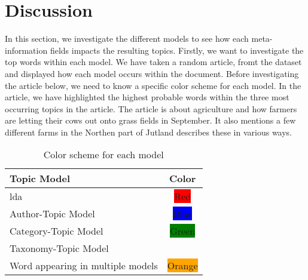 \section{Discussion}\label{sec:discussion}
In this section, we investigate the different models to see how each meta-information fields impacts the resulting topics.
Firstly, we want to investigate the top words within each model.
We have taken a random article, fromt the dataset and displayed how each model occurs within the document. 
Before investigating the article below, we need to know a specific color scheme for each model.
In the article, we have highlighted the highest probable words within the three most occurring topics in the article.
The article is about agriculture and how farmers are letting their cows out onto grass fields in September. 
It also mentions a few different farms in the Northen part of Jutland describes these in various ways.

\begin{table}[h]
	\centering
	\caption{Color scheme for each model}
	\begin{tabular}{l|c}
		Topic Model & Color \\
		\midrule
		\Acrlong{lda} & \colorbox{red}{Red} \\
		Author-Topic Model & \colorbox{blue}{Blue} \\
		Category-Topic Model & \colorbox{green}{Green} \\
		Taxonomy-Topic Model & \\
		Word appearing in multiple models & \colorbox{orange}{Orange}  \\
	\end{tabular}
	\label{tab:disc_color}
\end{table}

